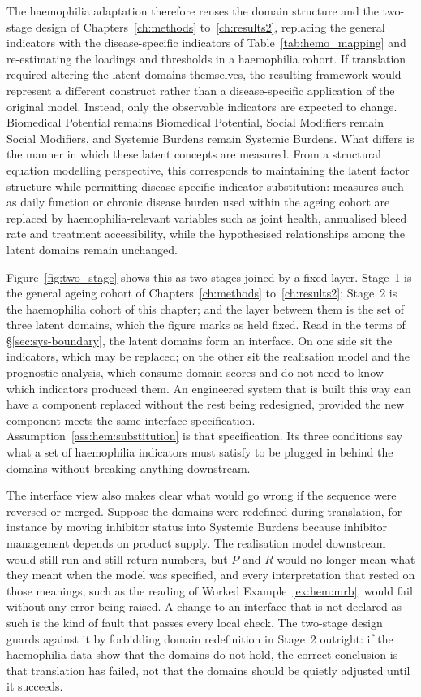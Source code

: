 The haemophilia adaptation therefore reuses the domain structure and the two-stage design of Chapters~\ref{ch:methods} to~\ref{ch:results2}, replacing the general indicators with the disease-specific indicators of Table~\ref{tab:hemo_mapping} and re-estimating the loadings and thresholds in a haemophilia cohort. If translation required altering the latent domains themselves, the resulting framework would represent a different construct rather than a disease-specific application of the original model. Instead, only the observable indicators are expected to change. Biomedical Potential remains Biomedical Potential, Social Modifiers remain Social Modifiers, and Systemic Burdens remain Systemic Burdens. What differs is the manner in which these latent concepts are measured. From a structural equation modelling perspective, this corresponds to maintaining the latent factor structure while permitting disease-specific indicator substitution: measures such as daily function or chronic disease burden used within the ageing cohort are replaced by haemophilia-relevant variables such as joint health, annualised bleed rate and treatment accessibility, while the hypothesised relationships among the latent domains remain unchanged.

Figure~\ref{fig:two_stage} shows this as two stages joined by a fixed layer. Stage~1 is the general ageing cohort of Chapters~\ref{ch:methods} to~\ref{ch:results2}; Stage~2 is the haemophilia cohort of this chapter; and the layer between them is the set of three latent domains, which the figure marks as held fixed. Read in the terms of \S\ref{sec:sys-boundary}, the latent domains form an interface. On one side sit the indicators, which may be replaced; on the other sit the realisation model and the prognostic analysis, which consume domain scores and do not need to know which indicators produced them. An engineered system that is built this way can have a component replaced without the rest being redesigned, provided the new component meets the same interface specification. Assumption~\ref{ass:hem:substitution} is that specification. Its three conditions say what a set of haemophilia indicators must satisfy to be plugged in behind the domains without breaking anything downstream.

The interface view also makes clear what would go wrong if the sequence were reversed or merged. Suppose the domains were redefined during translation, for instance by moving inhibitor status into Systemic Burdens because inhibitor management depends on product supply. The realisation model downstream would still run and still return numbers, but $P$ and $R$ would no longer mean what they meant when the model was specified, and every interpretation that rested on those meanings, such as the reading of Worked Example~\ref{ex:hem:mrb}, would fail without any error being raised. A change to an interface that is not declared as such is the kind of fault that passes every local check. The two-stage design guards against it by forbidding domain redefinition in Stage~2 outright: if the haemophilia data show that the domains do not hold, the correct conclusion is that translation has failed, not that the domains should be quietly adjusted until it succeeds.

